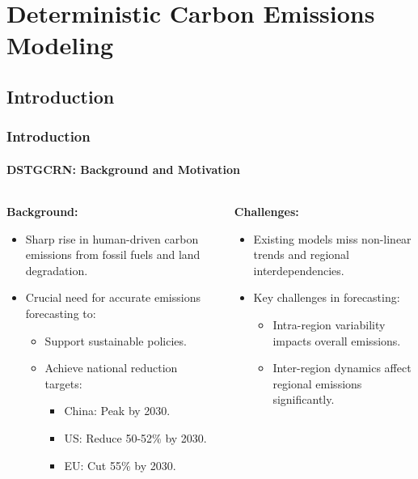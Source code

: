 \documentclass[light]{lutbeamer} %
\begin{document}

\section{Deterministic Carbon Emissions Modeling}
\subsection{Introduction}
\begin{frame}
    \frametitle{Introduction}
    \framesubtitle{DSTGCRN: Background and Motivation}
    \begin{columns}[T]
        \begin{column}{0.45\textwidth}
            \textbf{Background:}
            \begin{itemize}
                \item Sharp rise in human-driven carbon emissions from fossil fuels and land degradation.
                \item Crucial need for accurate emissions forecasting to:
                      \begin{itemize}
                          \item Support sustainable policies.
                          \item Achieve national reduction targets:
                                \begin{itemize}
                                    \item China: Peak by 2030.
                                    \item US: Reduce 50-52\% by 2030.
                                    \item EU: Cut 55\% by 2030.
                                \end{itemize}
                      \end{itemize}
            \end{itemize}
        \end{column}
        \begin{column}{0.45\textwidth}
            \textbf{Challenges:}
            \begin{itemize}
                \item Existing models miss non-linear trends and regional interdependencies.
                \item Key challenges in forecasting:
                      \begin{itemize}
                          \item Intra-region variability impacts overall emissions.
                          \item Inter-region dynamics affect regional emissions significantly.
                      \end{itemize}
            \end{itemize}
        \end{column}
    \end{columns}
\end{frame}
\end{document}
